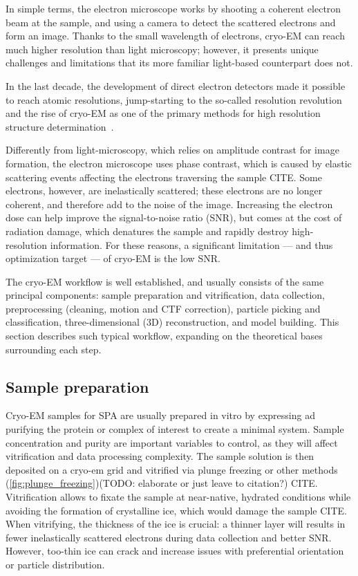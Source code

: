 In simple terms, the electron microscope works by shooting a coherent electron beam at the sample, and using a camera to detect the scattered electrons and form an image.
Thanks to the small wavelength of electrons, cryo-EM can reach much higher resolution than light microscopy; however, it presents unique challenges and limitations that its more familiar light-based counterpart does not.

In the last decade, the development of direct electron detectors made it possible to reach atomic resolutions, jump-starting to the so-called resolution revolution and the rise of cryo-EM as one of the primary methods for high resolution structure determination~\cite{faruqiCCDDetectorsHighresolution2000}.

Differently from light-microscopy, which relies on amplitude contrast for image formation, the electron microscope uses phase contrast, which is caused by elastic scattering events affecting the electrons traversing the sample CITE.
Some electrons, however, are inelastically scattered; these electrons are no longer coherent, and therefore add to the noise of the image.
Increasing the electron dose can help improve the signal-to-noise ratio (SNR), but comes at the cost of radiation damage, which denatures the sample and rapidly destroy high-resolution information.
For these reasons, a significant limitation --- and thus optimization target --- of cryo-EM is the low SNR.

The cryo-EM workflow is well established, and usually consists of the same principal components: sample preparation and vitrification, data collection, preprocessing (cleaning, motion and CTF correction), particle picking and classification, three-dimensional (3D) reconstruction, and model building.
This section describes such typical workflow, expanding on the theoretical bases surrounding each step.

\subsection{Sample preparation}
Cryo-EM samples for SPA are usually prepared in vitro by expressing ad purifying the protein or complex of interest to create a minimal system.
Sample concentration and purity are important variables to control, as they will affect vitrification and data processing complexity.
The sample solution is then deposited on a cryo-em grid and vitrified via plunge freezing or other methods (\autoref{fig:plunge_freezing})(TODO: elaborate or just leave to citation?) CITE.
Vitrification allows to fixate the sample at near-native, hydrated conditions while avoiding the formation of crystalline ice, which would damage the sample CITE.
When vitrifying, the thickness of the ice is crucial: a thinner layer will results in fewer inelastically scattered electrons during data collection and better SNR.
However, too-thin ice can crack and increase issues with preferential orientation or particle distribution.

